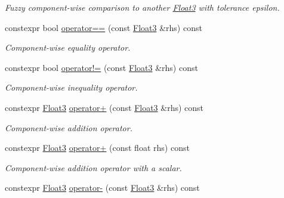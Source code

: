 \begin{DoxyCompactItemize}
\begin{DoxyCompactList}\small\item\em Fuzzy component-\/wise comparison to another \hyperlink{structcpom_1_1_float3}{Float3} with tolerance epsilon. \end{DoxyCompactList}\item 
constexpr bool \hyperlink{structcpom_1_1_float3_ab05cd7600744c7e534ca5f30538bad11}{operator==} (const \hyperlink{structcpom_1_1_float3}{Float3} \&rhs) const \hypertarget{structcpom_1_1_float3_ab05cd7600744c7e534ca5f30538bad11}{}\label{structcpom_1_1_float3_ab05cd7600744c7e534ca5f30538bad11}

\begin{DoxyCompactList}\small\item\em Component-\/wise equality operator. \end{DoxyCompactList}\item 
constexpr bool \hyperlink{structcpom_1_1_float3_a5dcbfcfc4aca86ebae72f6e45da22e80}{operator!=} (const \hyperlink{structcpom_1_1_float3}{Float3} \&rhs) const \hypertarget{structcpom_1_1_float3_a5dcbfcfc4aca86ebae72f6e45da22e80}{}\label{structcpom_1_1_float3_a5dcbfcfc4aca86ebae72f6e45da22e80}

\begin{DoxyCompactList}\small\item\em Component-\/wise inequality operator. \end{DoxyCompactList}\item 
constexpr \hyperlink{structcpom_1_1_float3}{Float3} \hyperlink{structcpom_1_1_float3_aadb3df13cdc0a00fb83eee0c57a86b17}{operator+} (const \hyperlink{structcpom_1_1_float3}{Float3} \&rhs) const \hypertarget{structcpom_1_1_float3_aadb3df13cdc0a00fb83eee0c57a86b17}{}\label{structcpom_1_1_float3_aadb3df13cdc0a00fb83eee0c57a86b17}

\begin{DoxyCompactList}\small\item\em Component-\/wise addition operator. \end{DoxyCompactList}\item 
constexpr \hyperlink{structcpom_1_1_float3}{Float3} \hyperlink{structcpom_1_1_float3_a3052dd6ffffbc349b2b57a11ebcbc8b3}{operator+} (const float rhs) const \hypertarget{structcpom_1_1_float3_a3052dd6ffffbc349b2b57a11ebcbc8b3}{}\label{structcpom_1_1_float3_a3052dd6ffffbc349b2b57a11ebcbc8b3}

\begin{DoxyCompactList}\small\item\em Component-\/wise addition operator with a scalar. \end{DoxyCompactList}\item 
constexpr \hyperlink{structcpom_1_1_float3}{Float3} \hyperlink{structcpom_1_1_float3_a1d1d544ab644716ddd6a33c6097a004a}{operator-\/} (const \hyperlink{structcpom_1_1_float3}{Float3} \&rhs) const \hypertarget{structcpom_1_1_float3_a1d1d544ab644716ddd6a33c6097a004a}{}\label{structcpom_1_1_float3_a1d1d544ab644716ddd6a33c6097a004a}


\end{DoxyCompactItemize}

